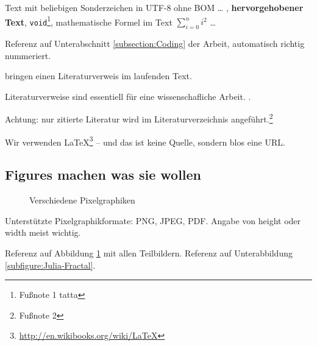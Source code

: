 
Text mit beliebigen Sonderzeichen in UTF-8 ohne BOM \ldots
,
\textbf{hervorgehobener Text},
\texttt{void}\footnote{Fußnote 1 tatta},
mathematische Formel im Text $\sum_{i=0}^n i^2$
\ldots

Referenz auf Unterabschnitt \ref{subsection:Coding} der Arbeit, automatisch richtig nummeriert.

\textcite[]{Mulloni:2010} bringen einen Literaturverweis im laufenden Text.

Literaturverweise sind essentiell für eine wissenschafliche Arbeit. \autocite[]{McConnell:2004:CCS:1096143}.

Achtung: nur zitierte Literatur wird im Literaturverzeichnis
angeführt.\footnote{Fußnote 2}


Wir verwenden \LaTeX\footnote{ \url{http://en.wikibooks.org/wiki/LaTeX}} -- und das
ist keine Quelle, sondern blos eine URL.

\subsection{Figures machen was sie wollen}

\begin{figure}[!ht]
	\centering
	\qquad
	\caption[
		Verschiedene Pixelgraphiken\newline
		\small\texttt{https://mediacube.at/wiki/}
	]{
		Verschiedene Pixelgraphiken
	}
	\label{figure:PixelImages}
\end{figure}

Unterstützte Pixelgraphikformate: PNG, JPEG, PDF.
Angabe von height oder width meist wichtig.

Referenz auf Abbildung \ref{figure:PixelImages} mit allen Teilbildern.
Referenz auf Unterabbildung \ref{subfigure:Julia-Fractal}.

